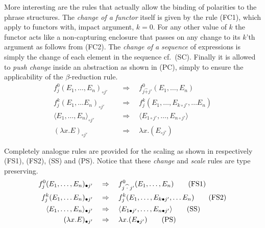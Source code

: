 \begin{definition}
More interesting are the rules that actually allow the binding of polarities to the phrase structures. The \emph{change of a functor} itself is given by the rule (FC1), which apply to functors with, impact argument, $k = 0$. For any other value of $k$ the functor acts like a non-capturing enclosure that passes on any change to its $k$'th argument as follows from (FC2). The \emph{change of a sequence} of expressions is simply the change of each element in the sequence cf.\ (SC). Finally it is allowed to \emph{push change} inside an abstraction as shown in (PC), simply to ensure the applicability of the $\beta$-reduction rule.
\begin{align}
f_j^0(E_1, \ldots, E_n)_{\circ j'} &\quad \Rightarrow \quad f_{j \widehat{+} j'}^0(E_1, \ldots, E_n)  \tag{FC1} \\
f_j^k(E_1, \ldots E_n)_{\circ j'} &\quad \Rightarrow \quad f_{j}^k(E_1, \ldots, E_{k \circ j'}, \ldots E_n )  \tag{FC2} \\
 \langle E_1, \ldots, E_n \rangle_{\circ j'} &\quad \Rightarrow \quad  \langle E_{1 \circ j'}, \ldots,  E_{n \circ j'} \rangle  \tag{SC} \\
 (\lambda x . E)_{\circ j'} &\quad \Rightarrow \quad 
 \lambda x . (E_{\circ j'})
 \tag{PC} 
\end{align}
\vspace{.3em}

Completely analogue rules are provided for the scaling as shown in respectively (FS1), (FS2), (SS) and (PS). Notice that these \emph{change} and \emph{scale} rules are type preserving.
\begin{align}
f_j^0(E_1, \ldots, E_n)_{\bullet j'} &\quad \Rightarrow \quad f_{j \widehat{\hspace{2.5pt} \cdot \hspace{2.5pt}} j'}^0(E_1, \ldots, E_n)  \tag{FS1} \\
f_j^k(E_1, \ldots E_n)_{\bullet j'} &\quad \Rightarrow \quad f_{j}^k(E_1, \ldots, E_{k \bullet j'}, \ldots E_n )  \tag{FS2} \\
 \langle E_1, \ldots, E_n \rangle_{\bullet j'} &\quad \Rightarrow \quad  \langle E_{1 \bullet j'}, \ldots,  E_{n \bullet j'} \rangle  \tag{SS} \\
(\lambda x . E)_{\bullet j'} &\quad \Rightarrow \quad 
 \lambda x . (E_{\bullet j'})
 \tag{PS} 
\end{align}


\end{definition}
